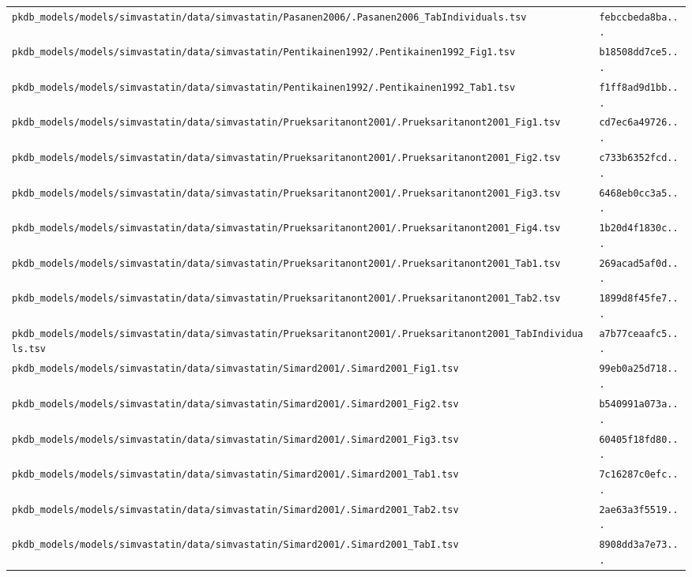 \begin{longtable}{ll}
\texttt{pkdb\_models/models/simvastatin/data/simvastatin/Pasanen2006/.Pasanen2006\_TabIndividuals.tsv} & \texttt{febccbeda8ba...} \\
\texttt{pkdb\_models/models/simvastatin/data/simvastatin/Pentikainen1992/.Pentikainen1992\_Fig1.tsv} & \texttt{b18508dd7ce5...} \\
\texttt{pkdb\_models/models/simvastatin/data/simvastatin/Pentikainen1992/.Pentikainen1992\_Tab1.tsv} & \texttt{f1ff8ad9d1bb...} \\
\texttt{pkdb\_models/models/simvastatin/data/simvastatin/Prueksaritanont2001/.Prueksaritanont2001\_Fig1.tsv} & \texttt{cd7ec6a49726...} \\
\texttt{pkdb\_models/models/simvastatin/data/simvastatin/Prueksaritanont2001/.Prueksaritanont2001\_Fig2.tsv} & \texttt{c733b6352fcd...} \\
\texttt{pkdb\_models/models/simvastatin/data/simvastatin/Prueksaritanont2001/.Prueksaritanont2001\_Fig3.tsv} & \texttt{6468eb0cc3a5...} \\
\texttt{pkdb\_models/models/simvastatin/data/simvastatin/Prueksaritanont2001/.Prueksaritanont2001\_Fig4.tsv} & \texttt{1b20d4f1830c...} \\
\texttt{pkdb\_models/models/simvastatin/data/simvastatin/Prueksaritanont2001/.Prueksaritanont2001\_Tab1.tsv} & \texttt{269acad5af0d...} \\
\texttt{pkdb\_models/models/simvastatin/data/simvastatin/Prueksaritanont2001/.Prueksaritanont2001\_Tab2.tsv} & \texttt{1899d8f45fe7...} \\
\texttt{pkdb\_models/models/simvastatin/data/simvastatin/Prueksaritanont2001/.Prueksaritanont2001\_TabIndividuals.tsv} & \texttt{a7b77ceaafc5...} \\
\texttt{pkdb\_models/models/simvastatin/data/simvastatin/Simard2001/.Simard2001\_Fig1.tsv} & \texttt{99eb0a25d718...} \\
\texttt{pkdb\_models/models/simvastatin/data/simvastatin/Simard2001/.Simard2001\_Fig2.tsv} & \texttt{b540991a073a...} \\
\texttt{pkdb\_models/models/simvastatin/data/simvastatin/Simard2001/.Simard2001\_Fig3.tsv} & \texttt{60405f18fd80...} \\
\texttt{pkdb\_models/models/simvastatin/data/simvastatin/Simard2001/.Simard2001\_Tab1.tsv} & \texttt{7c16287c0efc...} \\
\texttt{pkdb\_models/models/simvastatin/data/simvastatin/Simard2001/.Simard2001\_Tab2.tsv} & \texttt{2ae63a3f5519...} \\
\texttt{pkdb\_models/models/simvastatin/data/simvastatin/Simard2001/.Simard2001\_TabI.tsv} & \texttt{8908dd3a7e73...} \\

\end{longtable}
